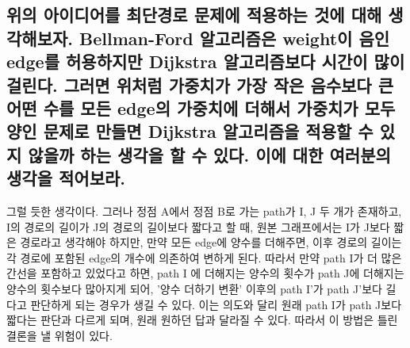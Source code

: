 \documentclass{article}
\begin{document}
\subsection{위의 아이디어를 최단경로 문제에 적용하는 것에 대해 생각해보자. Bellman-Ford 알고리즘은 weight이 음인 edge를 허용하지만 Dijkstra 알고리즘보다 시간이 많이 걸린다. 그러면 위처럼 가중치가 가장 작은 음수보다 큰 어떤 수를 모든 edge의 가중치에 더해서 가중치가 모두 양인 문제로 만들면 Dijkstra 알고리즘을 적용할 수 있지 않을까 하는 생각을 할 수 있다. 이에 대한 여러분의 생각을 적어보라.}
그럴 듯한 생각이다. 그러나 정점 A에서 정점 B로 가는 path가 I, J 두 개가 존재하고, I의 경로의 길이가 J의 경로의 길이보다 짧다고 할 때, 원본 그래프에서는 I가 J보다 짧은 경로라고 생각해야 하지만, 만약 모든 edge에 양수를 더해주면, 이후 경로의 길이는 각 경로에 포함된 edge의 개수에 의존하여 변하게 된다. 따라서 만약 path I가 더 많은 간선을 포함하고 있었다고 하면, path I 에 더해지는 양수의 횟수가 path J에 더해지는 양수의 횟수보다 많아지게 되어, '양수 더하기 변환' 이후의 path I'가 path J'보다 길다고 판단하게 되는 경우가 생길 수 있다. 이는 의도와 달리 원래 path I가 path J보다 짧다는 판단과 다르게 되며, 원래 원하던 답과 달라질 수 있다. 따라서 이 방법은 틀린 결론을 낼 위험이 있다.
\end{document}
